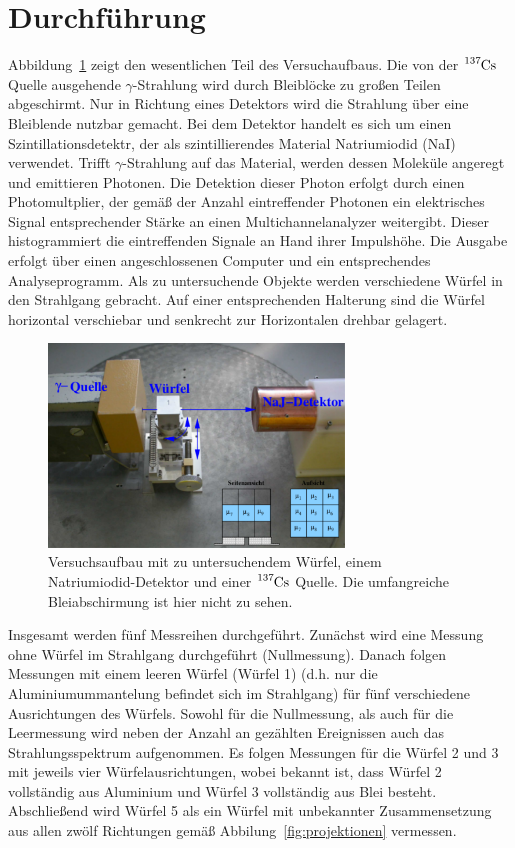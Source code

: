\section{Durchführung}
\label{sec:durchführung}

Abbildung~\ref{fig:aufbau} zeigt den wesentlichen Teil des Versuchaufbaus. Die
von der $\ce{^{137}Cs}$ Quelle ausgehende $\gamma$-Strahlung wird durch
Bleiblöcke zu großen Teilen abgeschirmt. Nur in Richtung eines Detektors wird
die Strahlung über eine Bleiblende nutzbar gemacht. Bei dem Detektor handelt es
sich um einen Szintillationsdetektr, der als szintillierendes Material
Natriumiodid (NaI) verwendet. Trifft $\gamma$-Strahlung auf das Material, werden
dessen Moleküle angeregt und emittieren Photonen. Die Detektion dieser Photon
erfolgt durch einen Photomultplier, der gemäß der Anzahl eintreffender Photonen
ein elektrisches Signal entsprechender Stärke an einen Multichannelanalyzer
weitergibt. Dieser histogrammiert die eintreffenden Signale an Hand ihrer
Impulshöhe. Die Ausgabe erfolgt über einen angeschlossenen Computer und ein
entsprechendes Analyseprogramm. Als zu untersuchende Objekte werden verschiedene
Würfel in den Strahlgang gebracht. Auf einer entsprechenden Halterung sind die
Würfel horizontal verschiebar und senkrecht zur Horizontalen drehbar gelagert.

\begin{figure}
  \centering
  \includegraphics[width=0.7\textwidth]{figures/aufbau.pdf}
  \caption{Versuchsaufbau mit zu untersuchendem Würfel, einem 
  Natriumiodid-Detektor und einer $\ce{^{137}Cs}$ Quelle. Die umfangreiche
  Bleiabschirmung ist hier nicht zu sehen.}
  \label{fig:aufbau}
\end{figure}

Insgesamt werden fünf Messreihen durchgeführt. Zunächst wird eine Messung ohne
Würfel im Strahlgang durchgeführt (Nullmessung). Danach folgen Messungen mit
einem leeren Würfel (Würfel 1) (d.h. nur die Aluminiumummantelung befindet sich
im Strahlgang) für fünf verschiedene Ausrichtungen des Würfels. Sowohl für die
Nullmessung, als auch für die Leermessung wird neben der Anzahl an gezählten
Ereignissen auch das Strahlungsspektrum aufgenommen. Es folgen Messungen für die
Würfel 2 und 3 mit jeweils vier Würfelausrichtungen, wobei bekannt ist, dass
Würfel 2 vollständig aus Aluminium und Würfel 3 vollständig aus Blei besteht.
Abschließend wird Würfel 5 als ein Würfel mit unbekannter Zusammensetzung aus
allen zwölf Richtungen gemäß Abbilung~\ref{fig:projektionen} vermessen.
